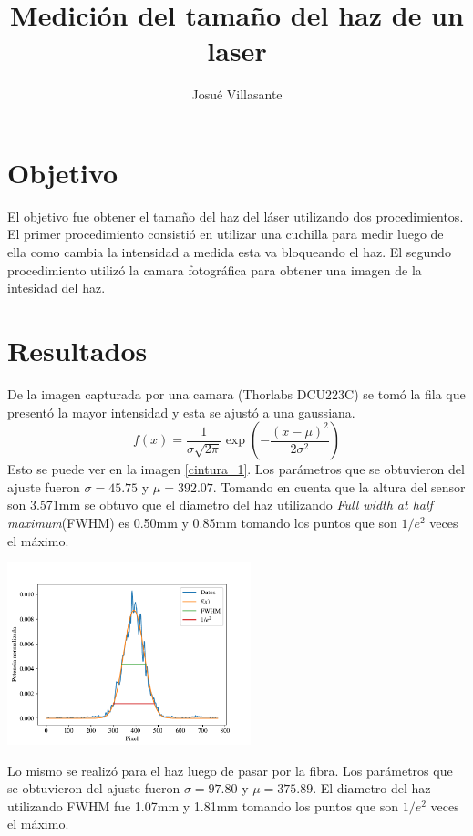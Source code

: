 \documentclass[onecolumn]{article}
\author{Josué Villasante}
\title{Medición del tamaño del haz de un laser}
\begin{document}
	\maketitle

	\section{Objetivo}
		El objetivo fue obtener el tamaño del haz del láser utilizando dos procedimientos. El primer procedimiento consistió en utilizar una cuchilla para medir luego de ella como cambia la intensidad a medida esta va bloqueando el haz. El segundo procedimiento utilizó la camara fotográfica para obtener una imagen de la intesidad del haz.

	\section{Resultados}
		De la imagen capturada por una camara (Thorlabs DCU223C) se tomó la fila que presentó la mayor intensidad y esta se ajustó a una gaussiana. 
		$$
		f(x) = \frac{1}{\sigma\sqrt{2\pi}}\exp({-\frac{(x-\mu)^2}{2\sigma^2}})
		$$
		Esto se puede ver en la imagen \ref{cintura_1}. Los parámetros que se obtuvieron del ajuste fueron $\sigma=45.75$ y $\mu=392.07$. Tomando en cuenta que la altura del sensor son 3.571mm se obtuvo que el diametro del haz utilizando \textit{Full width at half maximum}(FWHM) es 0.50mm y 0.85mm tomando los puntos que son $1/e^2$ veces el máximo.

		\begin{center}
			\includegraphics[width=200pt]{img/plot-LaserCintura.pdf}
			\label{cintura_1}
		\end{center}

		Lo mismo se realizó para el haz luego de pasar por la fibra. Los parámetros que se obtuvieron del ajuste fueron $\sigma=97.80$ y $\mu=375.89$. El diametro del haz utilizando FWHM fue 1.07mm y 1.81mm tomando los puntos que son $1/e^2$ veces el máximo.
\end{document}
